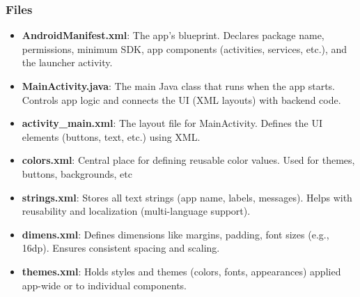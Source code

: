 \documentclass{report}
\begin{document}
    \pagebreak 
    \subsubsection{Files}
    \begin{itemize}
        \item \textbf{AndroidManifest.xml}: The app's blueprint. Declares package name, permissions, minimum SDK, app components (activities, services, etc.), and the launcher activity.
        \item \textbf{MainActivity.java}: The main Java class that runs when the app starts. Controls app logic and connects the UI (XML layouts) with backend code.
        \item \textbf{activity\_main.xml}: The layout file for MainActivity. Defines the UI elements (buttons, text, etc.) using XML.
        \item \textbf{colors.xml}: Central place for defining reusable color values. Used for themes, buttons, backgrounds, etc
        \item \textbf{strings.xml}: Stores all text strings (app name, labels, messages). Helps with reusability and localization (multi-language support).
        \item \textbf{dimens.xml}:  Defines dimensions like margins, padding, font sizes (e.g., 16dp). Ensures consistent spacing and scaling.
        \item \textbf{themes.xml}: Holds styles and themes (colors, fonts, appearances) applied app-wide or to individual components.
    \end{itemize}

    \pagebreak 
\end{document}
